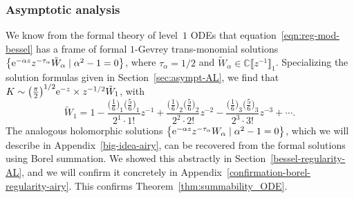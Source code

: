 \documentclass[10pt,a4paper]{amsart}
\newcommand{\C}{\mathbb{C}}
\newcommand{\series}[1]{\tilde{#1}}
\numberwithin{equation}{section}
\begin{document}
\subsubsection{Asymptotic analysis}\label{sec:asympt-airy}
%
We know from the formal theory of level~$1$ ODEs that equation~\eqref{eqn:reg-mod-bessel} has a frame of formal $1$-Gevrey trans-monomial solutions
$\big\{ {\rm e}^{-\alpha z} z^{-\tau_\alpha} \series{W}_\alpha \mid \alpha^2 - 1 = 0 \big\}$,
where $\tau_\alpha = 1/2$ and $\series{W}_\alpha\in\C\big\llbracket z^{-1} \big\rrbracket_1$. Specializing the solution formulas given in Section~\ref{sec:asympt-AL}, we find that $\smash{K \sim \bigl(\frac{\pi}{2}\bigr)^{1/2}} {\rm e}^{-z} \allowbreak\times z^{-1/2} \series{W}_1$, with
\[%
\series{W}_1 = 1 - \frac{\bigl(\frac{1}{6}\bigr)_1 \bigl(\frac{5}{6}\bigr)_1}{2^1 \cdot 1!} z^{-1} + \frac{\bigl(\frac{1}{6}\bigr)_2 \bigl(\frac{5}{6}\bigr)_2}{2^2 \cdot 2!} z^{-2} - \frac{\bigl(\frac{1}{6}\bigr)_3 \bigl(\frac{5}{6}\bigr)_3}{2^3 \cdot 3!} z^{-3} + \cdots.
\]
%
The analogous holomorphic solutions
$ \big\{ {\rm e}^{-\alpha z} z^{-\tau_\alpha} W_\alpha \mid \alpha^2 - 1 = 0 \big\}$,
which we will describe in Appendix~\ref{big-idea-airy}, can be recovered from the formal solutions using Borel summation. We showed this abstractly in Section~\ref{bessel-regularity-AL}, and we will confirm it concretely in Appendix~\ref{confirmation-borel-regularity-airy}. This confirms Theorem~\ref{thm:summability_ODE}.
\end{document}
